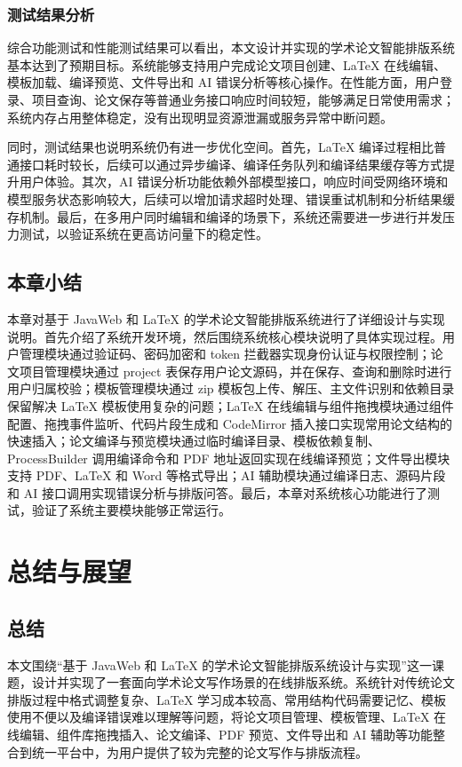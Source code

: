 \documentclass{xduugthesis}
\begin{document}
\subsection{测试结果分析}

综合功能测试和性能测试结果可以看出，本文设计并实现的学术论文智能排版系统基本达到了预期目标。系统能够支持用户完成论文项目创建、LaTeX 在线编辑、模板加载、编译预览、文件导出和 AI 错误分析等核心操作。在性能方面，用户登录、项目查询、论文保存等普通业务接口响应时间较短，能够满足日常使用需求；系统内存占用整体稳定，没有出现明显资源泄漏或服务异常中断问题。

同时，测试结果也说明系统仍有进一步优化空间。首先，LaTeX 编译过程相比普通接口耗时较长，后续可以通过异步编译、编译任务队列和编译结果缓存等方式提升用户体验。其次，AI 错误分析功能依赖外部模型接口，响应时间受网络环境和模型服务状态影响较大，后续可以增加请求超时处理、错误重试机制和分析结果缓存机制。最后，在多用户同时编辑和编译的场景下，系统还需要进一步进行并发压力测试，以验证系统在更高访问量下的稳定性。

\section{本章小结}
本章对基于 JavaWeb 和 LaTeX 的学术论文智能排版系统进行了详细设计与实现说明。首先介绍了系统开发环境，然后围绕系统核心模块说明了具体实现过程。用户管理模块通过验证码、密码加密和 token 拦截器实现身份认证与权限控制；论文项目管理模块通过 project 表保存用户论文源码，并在保存、查询和删除时进行用户归属校验；模板管理模块通过 zip 模板包上传、解压、主文件识别和依赖目录保留解决 LaTeX 模板使用复杂的问题；LaTeX 在线编辑与组件拖拽模块通过组件配置、拖拽事件监听、代码片段生成和 CodeMirror 插入接口实现常用论文结构的快速插入；论文编译与预览模块通过临时编译目录、模板依赖复制、ProcessBuilder 调用编译命令和 PDF 地址返回实现在线编译预览；文件导出模块支持 PDF、LaTeX 和 Word 等格式导出；AI 辅助模块通过编译日志、源码片段和 AI 接口调用实现错误分析与排版问答。最后，本章对系统核心功能进行了测试，验证了系统主要模块能够正常运行。

\chapter{总结与展望}

\section{总结}
本文围绕“基于 JavaWeb 和 LaTeX 的学术论文智能排版系统设计与实现”这一课题，设计并实现了一套面向学术论文写作场景的在线排版系统。系统针对传统论文排版过程中格式调整复杂、LaTeX 学习成本较高、常用结构代码需要记忆、模板使用不便以及编译错误难以理解等问题，将论文项目管理、模板管理、LaTeX 在线编辑、组件库拖拽插入、论文编译、PDF 预览、文件导出和 AI 辅助等功能整合到统一平台中，为用户提供了较为完整的论文写作与排版流程。
\end{document}
